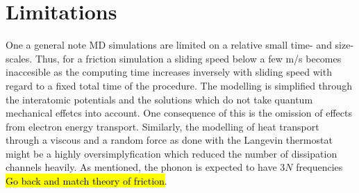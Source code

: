 




\section{Limitations}
One a general note \acrshort{MD} simulations are limited on a relative small time- and size-scales. Thus, for a friction simulation a sliding speed below a few m/s becomes inaccesible as the computing time increases inversely with sliding speed with regard to a fixed total time of the procedure. The modelling is simplified through the interatomic potentials and the solutions which do not take quantum mechanical effetcs into account. One consequence of this is the omission of effects from electron energy transport. Similarly, the modelling of heat transport through a viscous and a random force as done with the Langevin thermostat might be a highly oversimplyfication which reduced the number of dissipation channels heavily. As mentioned, the phonon is expected to have $3N$ frequencies \hl{Go back and match theory of friction}. 








